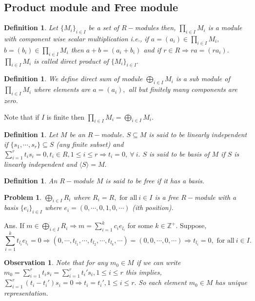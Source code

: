 \documentclass[11pt]{amsart}
\newtheorem{defn}[theorem]{Definition}
\newtheorem{problem}[theorem]{Problem}
\newtheorem{obs}[theorem]{Observation}
\newcommand{\ZZ}{\mathbb Z}
\begin{document}
\subsection{Product module and Free module}
\begin{defn}
Let $\{M_i\}_{i\in I}$ be a set of $R-$modules then, $\displaystyle\prod_{i\in I} M_i$ is a module with component wise scalar multiplication i.e., if $a=(a_i)\in \displaystyle\prod_{i\in I} M_i,$ $b=(b_i)\in \displaystyle\prod_{i\in I} M_i$ then $a+b=(a_i+b_i)$ and if $r\in R \Rightarrow ra=(ra_i).$ $\displaystyle\prod_{i\in I} M_i$ is called direct product of $\{M_i\}_{i\in I}.$
\end{defn}

\begin{defn}
We define direct sum of module $\displaystyle\bigoplus_{i\in I} M_i$ is a sub module of $\displaystyle\prod_{i\in I} M_i$ where  elements are $a=(a_i),$ all but finitely many components are zero.
\end{defn}
Note that if $I$ is finite then $\displaystyle\prod_{i\in I} M_i=\displaystyle\bigoplus_{i\in I} M_i$.

\begin{defn}
Let $M$ be an $R-$module. $S\subseteq M$ is said to be linearly independent if $\{s_1,\cdots ,s_r\}\subseteq S$ (any finite subset) and $\displaystyle\sum_{i=1}^r t_is_i=0,t_i\in R,1\leq i\leq r \Rightarrow t_i=0, ~\forall~i.$ $S$ is said to be basis of $M$ if $S$ is linearly independent and $\langle S\rangle=M.$
\end{defn}

\begin{defn}
An $R-$module $M$ is said to be free if it has a basis.
\end{defn}

\begin{problem}
$\displaystyle\bigoplus_{i\in I}R_i$ where $R_i=R,\text{~for all}~ i\in I$ is a free $R-$module with a basis $\{e_i\}_{i\in I}$ where $e_i=(0,\cdots ,0,1,0,\cdots)$ (ith position).
\end{problem}
Ans. If $m\in \displaystyle\bigoplus_{i\in I}R_i\Rightarrow m=\displaystyle\sum_{i=1}^k c_ie_{l_i}$ for some $k\in {\ZZ}^+.$ Suppose, $$\displaystyle\sum_{i=1}^k t_{l_i}e_{l_i}=0 \Rightarrow (0,\cdots ,t_{l_1},\cdots ,t_{l_2},\cdots ,t_{l_k},\cdots)=(0,0,\cdots,0,\cdots) \Rightarrow t_{l_i}=0, \text{~for all}~i\in I.$$

\begin{obs}
Note that for any $m_0\in M$ if we can write $m_0=\displaystyle\sum_{i=1}^rt_is_i=\displaystyle\sum_{i=1}^r t_i's_i,1\leq i\leq r$ this implies, $\displaystyle\sum_{i=1}^r(t_i-t_i')s_i=0 \Rightarrow t_i=t_i', 1\leq i\leq r.$ So each element $m_0\in M$ has unique representation.
\end{obs}
\end{document}
